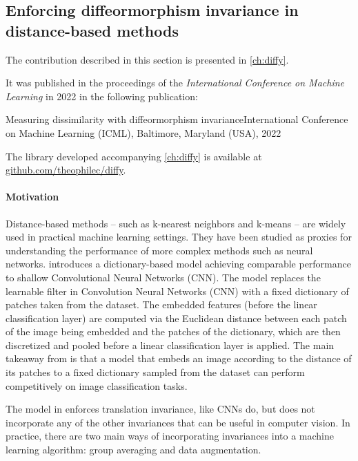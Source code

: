 \subsection{Enforcing diffeormorphism invariance in distance-based methods}
\begin{mdframed}
The contribution described in this section is presented in \cref{ch:diffy}.

\noindent It was published in the proceedings of the \emph{International Conference on Machine Learning} in 2022 in the following publication:
\begin{mdframed}
{Measuring dissimilarity with diffeormorphism invariance}{International Conference on Machine Learning (ICML), Baltimore, Maryland (USA), 2022}
\end{mdframed}
The library developed accompanying \cref{ch:diffy} is available at \url{github.com/theophilec/diffy}.
\end{mdframed}

\paragraph{Motivation}
Distance-based methods -- such as k-nearest neighbors and k-means -- are widely used in practical machine learning settings. They have been studied as proxies for understanding the performance of more complex methods such as neural networks. \cite{thiry} introduces a dictionary-based model achieving comparable performance to shallow Convolutional Neural Networks (CNN). The model replaces the learnable filter in Convolution Neural Networks (CNN) with a fixed dictionary of patches taken from the dataset. The embedded features (before the linear classification layer) are computed via the Euclidean distance between each patch of the image being embedded and the patches of the dictionary, which are then discretized and pooled before a linear classification layer is applied. The main takeaway from \cite{thiry} is that a model that embeds an image according to the distance of its patches to a fixed dictionary sampled from the dataset can perform competitively on image classification tasks.

The model in \cite{thiry} enforces translation invariance, like CNNs do, but does not incorporate any of the other invariances that can be useful in computer vision. In practice, there are two main ways of incorporating invariances into a machine learning algorithm: group averaging and data augmentation.

